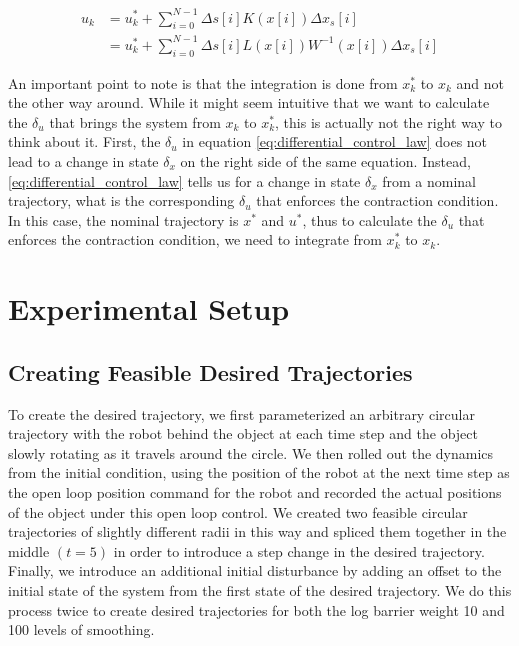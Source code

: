 \documentclass[journal]{IEEEtran}
\begin{document}
\begin{equation}
	\label{eq:control_law}
	\begin{aligned}
		u_k &= u^*_k + \sum_{i=0}^{N-1} \Delta s[i] K(x[i]) \Delta x_s[i]  \\
		&= u^*_k + \sum_{i=0}^{N-1} \Delta s[i] L(x[i]) W^{-1}(x[i]) \Delta x_s[i]
	\end{aligned}
\end{equation}

An important point to note is that the integration is done from $x^*_k$ to $x_k$ and not the other way around. While it might seem intuitive that we want to calculate the $\delta_u$ that brings the system from $x_k$ to $x^*_k$, this is actually not the right way to think about it. First, the $\delta_u$ in equation \ref{eq:differential_control_law} does not lead to a change in state $\delta_x$ on the right side of the same equation. Instead, \ref{eq:differential_control_law} tells us for a change in state $\delta_x$ from a nominal trajectory, what is the corresponding $\delta_u$ that enforces the contraction condition. In this case, the nominal trajectory is $x^*$ and $u^*$, thus to calculate the $\delta_u$ that enforces the contraction condition, we need to integrate from $x^*_k$ to $x_k$.

\section{Experimental Setup}
\subsection{Creating Feasible Desired Trajectories}
To create the desired trajectory, we first parameterized an arbitrary circular trajectory with the robot behind the object at each time step and the object slowly rotating as it travels around the circle. We then rolled out the dynamics from the initial condition, using the position of the robot at the next time step as the open loop position command for the robot and recorded the actual positions of the object under this open loop control. We created two feasible circular trajectories of slightly different radii in this way and spliced them together in the middle $(t=5)$ in order to introduce a step change in the desired trajectory. Finally, we introduce an additional initial disturbance by adding an offset to the initial state of the system from the first state of the desired trajectory. We do this process twice to create desired trajectories for both the log barrier weight 10 and 100 levels of smoothing.
\end{document}
